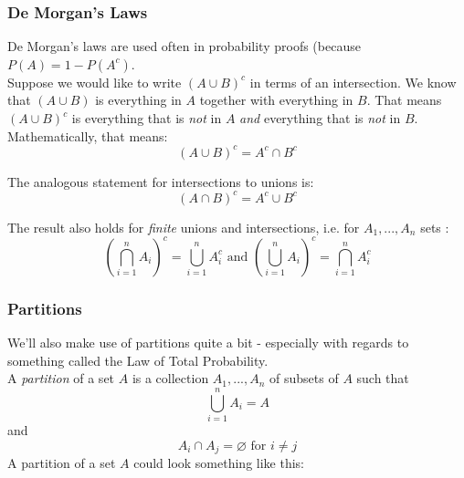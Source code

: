 \documentclass[12pt]{article} %
\begin{document}
\subsubsection{De Morgan's Laws}
De Morgan's laws are used often in probability proofs (because $P(A) = 1-P(A^c)$.\\

Suppose we would like to write $(A\cup B)^c$ in terms of an intersection. We know that  $(A\cup B)$ is everything in $A$ together with everything in $B$. That means $(A\cup B)^c$ is everything that is \emph{not} in $A$ \emph{and} everything that is \emph{not} in $B$. Mathematically, that means:
$$\left(A\cup B\right)^c = A^c\cap B^c$$

The analogous statement for intersections to unions is:
$$\left(A\cap B\right)^c = A^c\cup B^c$$

The result also holds for \emph{finite} unions and intersections, i.e. for $A_1,...,A_n$ sets :
$$\left(\bigcap_{i=1}^n A_i\right)^c = \bigcup_{i=1}^n A_i^c \textrm{ and } \left(\bigcup_{i=1}^n A_i\right)^c = \bigcap_{i=1}^n A_i^c$$
\subsubsection{Partitions}
We'll also make use of partitions quite a bit - especially with regards to something called the Law of Total Probability.\\
A \emph{partition} of a set $A$ is a collection $A_1,...,A_n$ of subsets of $A$ such that 
$$\bigcup_{i=1}^n A_i = A$$
and
$$A_i\cap A_j = \varnothing \textrm{ for } i\neq j$$
A partition of a set $A$ could look something like this:\\\\\\
\end{document}
